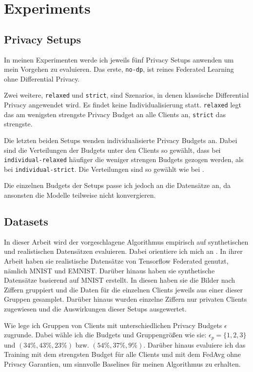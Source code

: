 \chapter{Experiments}

\section{Privacy Setups}
In meinen Experimenten werde ich jeweils fünf Privacy Setups anwenden um mein Vorgehen zu evaluieren. Das erste, \texttt{no-dp}, ist reines Federated Learning ohne Differential Privacy. 

Zwei weitere, \texttt{relaxed} und \texttt{strict}, sind Szenarios, in denen klassische Differential Privacy angewendet wird. Es findet keine Individualisierung statt. \texttt{relaxed} legt das am wenigsten strengste Privacy Budget an alle Clients an, \texttt{strict} das strengste.

Die letzten beiden Setups wenden individualisierte Privacy Budgets an. Dabei sind die Verteilungen der Budgets unter den Clients so gewählt, dass bei \texttt{individual-relaxed} häufiger die weniger strengen Budgets gezogen werden, als bei \texttt{individual-strict}. Die Verteilungen sind so gewählt wie bei \textcite[p. 8]{boenisch:2023}.

Die einzelnen Budgets der Setups passe ich jedoch an die Datensätze an, da ansonsten die Modelle teilweise nicht konvergieren.

\section{Datasets}

In dieser Arbeit wird der vorgeschlagene Algorithmus empirisch auf synthetischen und realistischen Datensätzen evaluieren. Dabei orientiere ich mich an \textcite{aldaghri:2023}. In ihrer Arbeit haben sie realistische Datensätze von Tensorflow Federated genutzt, nämlich MNIST und EMNIST. Darüber hinaus haben sie synthetische Datensätze basierend auf MNIST erstellt. In diesen haben sie die Bilder nach Ziffern gruppiert und die Daten für die einzelnen Clients jeweils aus einer dieser Gruppen gesamplet. Darüber hinaus wurden einzelne Ziffern nur privaten Clients zugewiesen und die Auswirkungen dieser Setups ausgewertet.

Wie \textcite{boenisch:2023} lege ich Gruppen von Clients mit unterschiedlichen Privacy Budgets $\epsilon$ zugrunde. Dabei wähle ich die Budgets und Gruppengrößen wie sie: $\epsilon_p = \{1,2,3\}$ und $(34\%, 43\%, 23\%)$ bzw. $(54\%, 37\%, 9\%)$. Darüber hinaus evaluiere ich das Training mit dem strengsten Budget für alle Clients und mit dem FedAvg ohne Privacy Garantien, um sinnvolle Baselines für meinen Algorithmus zu erhalten.

